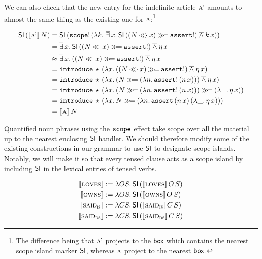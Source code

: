 We can also check that the new entry for the indefinite article $\textsc{a'}$
amounts to almost the same thing as the existing one for
$\textsc{a}$:\footnote{The difference being that $\textsc{a'}$ projects to the
  $\mathsf{box}$ which contains the nearest scope island marker $\mathsf{SI}$, whereas
  $\textsc{a}$ project to the nearest $\mathsf{box}$.}

\begin{align*}
\ap{\SI}{(\ap{\sem{\abs{a'}}}{N})}
&= \ap{\SI}{(\ap{\op{scope}!}{(\lam{k}{\dexists x.\,\ap{\SI}{((N \apl x) \hsbind \op{assert}!)} \dand \ap{k}{x}})})} \\
&= \dexists x.\,\ap{\SI}{((N \apl x) \hsbind \op{assert}!)} \dand \etaE{x} \\
&\approx \dexists x.\,((N \apl x) \hsbind \op{assert}!) \dand \etaE{x} \\
&= \app{\op{introduce}}{\star}{(\lam{x}{((N \apl x) \hsbind \op{assert}!) \dand \etaE{x}})} \\
&= \app{\op{introduce}}{\star}{(\lam{x}{(N \hsbind (\lam{n}{\ap{\op{assert}!}{(\ap{n}{x})}})) \dand \etaE{x}})} \\
&= \app{\op{introduce}}{\star}{(\lam{x}{(N \hsbind (\lam{n}{\ap{\op{assert}!}{(\ap{n}{x})}})) \hsbind (\lam{\_}{\etaE{x}})})} \\
&= \app{\op{introduce}}{\star}{(\lam{x}{N \hsbind (\lam{n}{\app{\op{assert}}{(\ap{n}{x})}{(\lam{\_}{\etaE{x}})}})})} \\
&= \ap{\sem{\abs{a}}}{N}
\end{align*}

Quantified noun phrases using the $\mathtt{scope}$ effect take scope over
all the material up to the nearest enclosing $\mathsf{SI}$ handler. We should
therefore modify some of the existing constructions in our grammar to use
$\mathsf{SI}$ to designate scope islands. Notably, we will make it so that every
tensed clause acts as a scope island by including $\mathsf{SI}$ in the lexical
entries of tensed verbs.

\begin{align*}
  \llbracket \textsc{loves} \rrbracket &:= \lambda O S.\, \mathsf{SI}\,(\llbracket \textsc{loves} \rrbracket\,O\,S) \\
  \llbracket \textsc{owns} \rrbracket &:= \lambda O S.\, \mathsf{SI}\,(\llbracket \textsc{owns} \rrbracket\,O\,S) \\
  \llbracket \textsc{said}_{\textsc{is}} \rrbracket &:= \lambda C S.\, \mathsf{SI}\,(\llbracket \textsc{said}_{\textsc{is}} \rrbracket\,C\,S) \\
  \llbracket \textsc{said}_{\textsc{ds}} \rrbracket &:= \lambda C S.\, \mathsf{SI}\,(\llbracket \textsc{said}_{\textsc{ds}} \rrbracket\,C\,S)
\end{align*}


